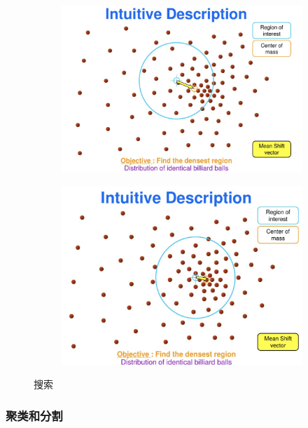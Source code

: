 \documentclass[a4paper, 11pt]{article}
\begin{document}
\begin{figure}[H]
    \centering
    \begin{subfigure}[b]{0.4\textwidth}
        \centering
        \includegraphics[width=\textwidth]{images/mean1.png}
        
    \end{subfigure}
    \hfill
    \begin{subfigure}[b]{0.4\textwidth}
        \centering
        \includegraphics[width=\textwidth]{images/mean2.png}
    
    \end{subfigure}
\caption{搜索}
\label{fig:search}
\end{figure}

\subsubsection{聚类和分割}
\end{document}
